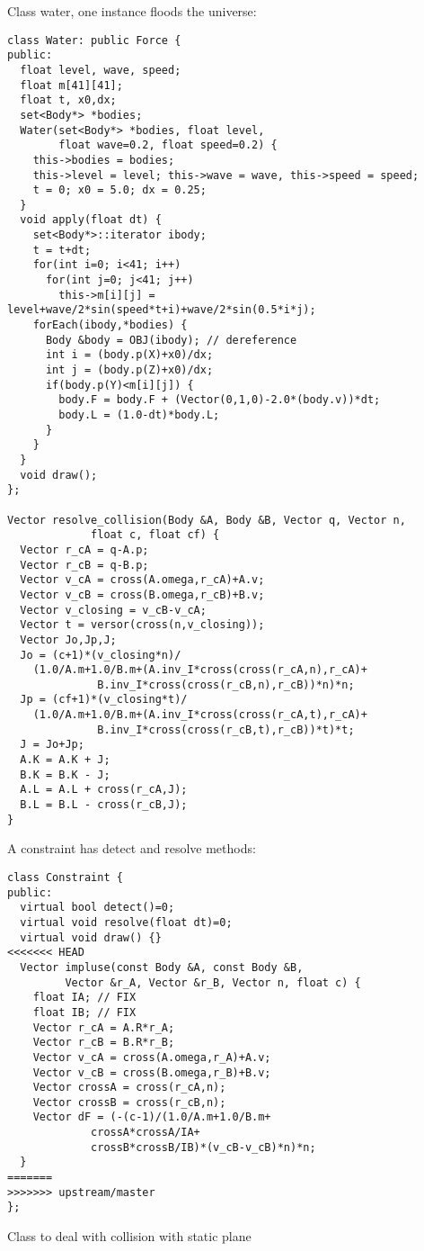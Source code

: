 \noindent
Class water, one instance floods the universe: \begin{lstlisting}
class Water: public Force {
public:
  float level, wave, speed;
  float m[41][41];
  float t, x0,dx;
  set<Body*> *bodies;
  Water(set<Body*> *bodies, float level,
        float wave=0.2, float speed=0.2) {
    this->bodies = bodies;
    this->level = level; this->wave = wave, this->speed = speed;
    t = 0; x0 = 5.0; dx = 0.25;
  }
  void apply(float dt) {
    set<Body*>::iterator ibody;
    t = t+dt;
    for(int i=0; i<41; i++)
      for(int j=0; j<41; j++)
        this->m[i][j] = level+wave/2*sin(speed*t+i)+wave/2*sin(0.5*i*j);
    forEach(ibody,*bodies) {
      Body &body = OBJ(ibody); // dereference
      int i = (body.p(X)+x0)/dx;
      int j = (body.p(Z)+x0)/dx;
      if(body.p(Y)<m[i][j]) {
        body.F = body.F + (Vector(0,1,0)-2.0*(body.v))*dt;
        body.L = (1.0-dt)*body.L;
      }
    }
  }
  void draw();
};

Vector resolve_collision(Body &A, Body &B, Vector q, Vector n, 
			 float c, float cf) {
  Vector r_cA = q-A.p;
  Vector r_cB = q-B.p;
  Vector v_cA = cross(A.omega,r_cA)+A.v;
  Vector v_cB = cross(B.omega,r_cB)+B.v;
  Vector v_closing = v_cB-v_cA;
  Vector t = versor(cross(n,v_closing));
  Vector Jo,Jp,J;
  Jo = (c+1)*(v_closing*n)/
    (1.0/A.m+1.0/B.m+(A.inv_I*cross(cross(r_cA,n),r_cA)+
		      B.inv_I*cross(cross(r_cB,n),r_cB))*n)*n;
  Jp = (cf+1)*(v_closing*t)/
    (1.0/A.m+1.0/B.m+(A.inv_I*cross(cross(r_cA,t),r_cA)+
		      B.inv_I*cross(cross(r_cB,t),r_cB))*t)*t;
  J = Jo+Jp;
  A.K = A.K + J;
  B.K = B.K - J;
  A.L = A.L + cross(r_cA,J);
  B.L = B.L - cross(r_cB,J);
}
\end{lstlisting}
\noindent
A constraint has detect and resolve methods: \begin{lstlisting}
class Constraint {
public:
  virtual bool detect()=0;
  virtual void resolve(float dt)=0;
  virtual void draw() {}
<<<<<<< HEAD
  Vector impluse(const Body &A, const Body &B, 
		 Vector &r_A, Vector &r_B, Vector n, float c) {
    float IA; // FIX
    float IB; // FIX
    Vector r_cA = A.R*r_A;
    Vector r_cB = B.R*r_B;
    Vector v_cA = cross(A.omega,r_A)+A.v;
    Vector v_cB = cross(B.omega,r_B)+B.v;
    Vector crossA = cross(r_cA,n);
    Vector crossB = cross(r_cB,n);
    Vector dF = (-(c-1)/(1.0/A.m+1.0/B.m+
			 crossA*crossA/IA+
			 crossB*crossB/IB)*(v_cB-v_cB)*n)*n;
  }
=======
>>>>>>> upstream/master
};
\end{lstlisting}
\noindent
Class to deal with collision with static plane
